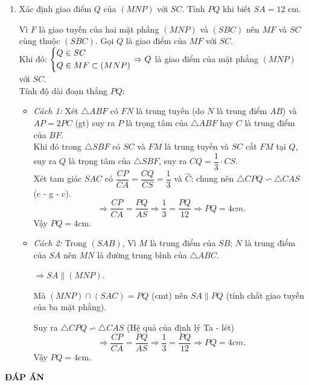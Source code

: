 \begin{ex}
{\begin{enumerate}[1.]
\begin{enumerate}[1.1.]
				\item Do $NP$ không song song với $BC$ và cùng nằm trên mặt phẳng $(ABC)$ nên gọi $F$ là giao điểm của $NP$ và $BC$ kéo dài.\\
				Ta có $\heva{&F\in BC\\ &BC\subset (SBC)}$ và $\heva{&F\in NP\\ &NP\subset (MNP)}$ $\Rightarrow \heva{&F\in (SBC)\\ &F\in (MNP)} \Rightarrow F$ là điểm chung thứ nhất của hai mặt phẳng $(MNP)$ và $(SBC)$. $\quad (3)$\\
				Tương tự, $M$ là điểm chung thứ hai của hai mặt phẳng $(MNP)$ và $(SBC)$. $\quad (4)$\\
				Từ $(3)$ và $(4)$, suy ra giao tuyến của hai mặt phẳng $(MNP)$ và $(SBC)$ là đường thẳng $MF$.
			\end{enumerate}
		\item Xác định giao điểm $Q$ của $(MNP)$ với $SC$. Tính $PQ$ khi biết $SA=12$ cm.
		
		Vì $F$ là giao tuyến của hai mặt phẳng $(MNP)$ và $(SBC)$ nên $MF$ và $SC$ cùng thuộc $(SBC)$. Gọi $Q$ là giao điểm của $MF$ với $SC$.\\
		Khi đó: $\left\{\begin{aligned}&Q\in SC\\ &Q\in MF\subset (MNP)\end{aligned}\right.\Rightarrow Q$ là giao điểm của mặt phẳng $(MNP)$ với $SC$.\\
		Tính độ dài đoạn thẳng $PQ$:
\begin{itemize}
	\item \textit{Cách 1:} Xét $\triangle ABF$ có $FN$ là trung tuyến (do $N$ là trung điểm $AB$) và $AP=2PC$ (gt) suy ra $P$ là trọng tâm của $\triangle ABF$ hay $C$ là trung điểm của $BF$.\\
	Khi đó trong $\triangle SBF$ có $SC$ và $FM$ là trung tuyến và $SC$ cắt $FM$ tại $Q$, suy ra $Q$ là trọng tâm của $\triangle SBF$, suy ra $CQ=\dfrac{1}{3}\cdot CS$.\\
	Xét tam giác $SAC$ có $\dfrac{CP}{CA}=\dfrac{CQ}{CS}=\dfrac{1}{3}$ và $\widehat C$: chung nên $\triangle CPQ \backsim \triangle CAS$ (c - g - c).
	$$\Rightarrow \dfrac{CP}{CA}=\dfrac{PQ}{AS}
	\Rightarrow \dfrac{1}{3}=\dfrac{PQ}{12}
	\Rightarrow PQ=4cm.$$
	Vậy $PQ=4$cm.
	\item \textit{Cách 2:} Trong $(SAB)$, Vì $M$ là trung điểm của $SB$; $N$ là trung điểm của $SA$ nên $MN$ là đường trung bình của $\triangle ABC$.
	
	$\Rightarrow SA\parallel (MNP)$.
	
	Mà $(MNP)\cap (SAC)=PQ$ (cmt) nên $SA\parallel PQ$ (tính chất giao tuyến của ba mặt phẳng).
	
	Suy ra $\triangle CPQ \backsim \triangle CAS$ (Hệ quả của định lý Ta - lét)
	$$\Rightarrow \dfrac{CP}{CA}=\dfrac{PQ}{AS}
\Rightarrow \dfrac{1}{3}=\dfrac{PQ}{12}
\Rightarrow PQ=4cm.$$
Vậy $PQ=4$cm.
\end{itemize}
			

\end{enumerate}
}
\end{ex}

\newpage
\begin{center}
	\textbf{ĐÁP ÁN}
\end{center}
\begin{multicols}{10}
	
\end{multicols}
